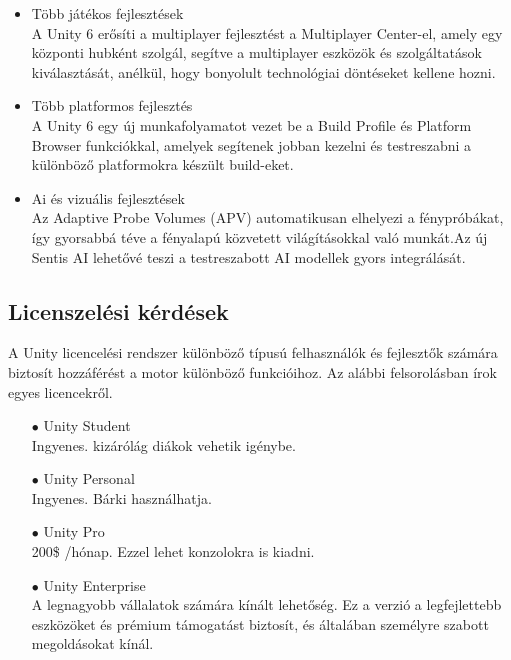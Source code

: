 \documentclass[
]{thesis-ekf}
\theoremstyle{definition}
\theoremstyle{remark}
\begin{document}
\begin{itemize}
\begin{itemize}
		\item Több játékos fejlesztések \\A  Unity 6 erősíti a multiplayer fejlesztést a Multiplayer Center-el, amely egy központi hubként szolgál, segítve a multiplayer eszközök és szolgáltatások kiválasztását, anélkül, hogy bonyolult technológiai döntéseket kellene hozni.
		\item Több platformos fejlesztés \\A Unity 6 egy új munkafolyamatot vezet be a Build Profile és Platform Browser funkciókkal, amelyek segítenek jobban kezelni és testreszabni a különböző platformokra készült build-eket.
		\item Ai és vizuális fejlesztések \\Az Adaptive Probe Volumes (APV) automatikusan elhelyezi a fénypróbákat, így gyorsabbá téve a fényalapú közvetett világításokkal való munkát.Az új Sentis AI lehetővé teszi a testreszabott AI modellek gyors integrálását.\cite{Unity6}
	\end{itemize}
\end{itemize}
\subsection{Licenszelési kérdések}
A Unity licencelési rendszer különböző típusú felhasználók és fejlesztők számára biztosít hozzáférést a motor különböző funkcióihoz. Az alábbi felsorolásban írok egyes licencekről.
\begin{itemize}
	\item[$\bullet$] Unity Student \\ Ingyenes. kizárólág diákok vehetik igénybe.
	\item[$\bullet$] Unity Personal\\ Ingyenes. Bárki használhatja.
	\item[$\bullet$] Unity Pro\\200\$ /hónap. Ezzel lehet konzolokra is kiadni.
	\item[$\bullet$] Unity Enterprise\\A legnagyobb vállalatok számára kínált lehetőség. Ez a verzió a legfejlettebb eszközöket és prémium támogatást biztosít, és általában személyre szabott megoldásokat kínál.\cite{UnityLicences}
\end{itemize}
\end{document}
